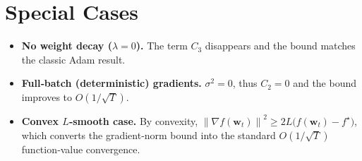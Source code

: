 \documentclass{article}
\newcommand{\norm}[1]{\left\|#1\right\|}
\begin{document}
\section*{Special Cases}
\begin{itemize}
\item \textbf{No weight decay ($\lambda=0$).} The term $C_{3}$ disappears and the bound matches the classic Adam result.
\item \textbf{Full‑batch (deterministic) gradients.} $\sigma^{2}=0$, thus $C_{2}=0$ and the bound improves to $O(1/\sqrt{T})$.
\item \textbf{Convex $L$‑smooth case.} By convexity, $\norm{\nabla f(\bm w_{t})}^{2}\ge 2L\bigl(f(\bm w_{t})-f^{\star}\bigr)$, which converts the gradient‑norm bound into the standard $O(1/\sqrt{T})$ function‑value convergence.
\end{itemize}
\end{document}
